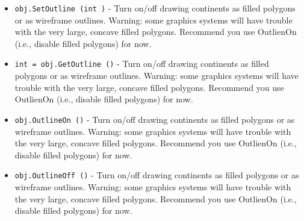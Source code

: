\begin{itemize}
\item  \verb|obj.SetOutline (int )| -  Turn on/off drawing continents as filled polygons or as wireframe outlines.
 Warning: some graphics systems will have trouble with the very large, concave 
 filled polygons. Recommend you use OutlienOn (i.e., disable filled polygons) 
 for now.

\item  \verb|int = obj.GetOutline ()| -  Turn on/off drawing continents as filled polygons or as wireframe outlines.
 Warning: some graphics systems will have trouble with the very large, concave 
 filled polygons. Recommend you use OutlienOn (i.e., disable filled polygons) 
 for now.

\item  \verb|obj.OutlineOn ()| -  Turn on/off drawing continents as filled polygons or as wireframe outlines.
 Warning: some graphics systems will have trouble with the very large, concave 
 filled polygons. Recommend you use OutlienOn (i.e., disable filled polygons) 
 for now.

\item  \verb|obj.OutlineOff ()| -  Turn on/off drawing continents as filled polygons or as wireframe outlines.
 Warning: some graphics systems will have trouble with the very large, concave 
 filled polygons. Recommend you use OutlienOn (i.e., disable filled polygons) 
 for now.

\end{itemize}
